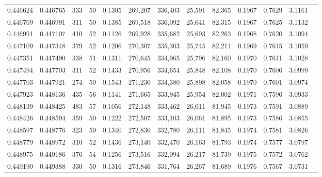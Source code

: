 \begin{tabular}{rrrrrrrrrrrrr}
0.446624 & 0.446765 &   333 &  50 &                                     0.1305 & 269,207 & 336,403 &  25,591 &  82,365 & 0.1967 & 0.7629 & 3.1161 \\
0.446769 & 0.446991 &   311 &  50 &                                     0.1385 & 269,518 & 336,092 &  25,641 &  82,315 & 0.1967 & 0.7625 & 3.1132 \\
0.446991 & 0.447107 &   410 &  52 &                                     0.1126 & 269,928 & 335,682 &  25,693 &  82,263 & 0.1968 & 0.7620 & 3.1094 \\
0.447109 & 0.447348 &   379 &  52 &                                     0.1206 & 270,307 & 335,303 &  25,745 &  82,211 & 0.1969 & 0.7615 & 3.1059 \\
0.447351 & 0.447490 &   338 &  51 &                                     0.1311 & 270,645 & 334,965 &  25,796 &  82,160 & 0.1970 & 0.7611 & 3.1028 \\
0.447494 & 0.447703 &   311 &  52 &                                     0.1433 & 270,956 & 334,654 &  25,848 &  82,108 & 0.1970 & 0.7606 & 3.0999 \\
0.447703 & 0.447921 &   274 &  50 &                                     0.1543 & 271,230 & 334,380 &  25,898 &  82,058 & 0.1970 & 0.7601 & 3.0974 \\
0.447923 & 0.448136 &   435 &  56 &                                     0.1141 & 271,665 & 333,945 &  25,954 &  82,002 & 0.1971 & 0.7596 & 3.0933 \\
0.448139 & 0.448425 &   483 &  57 &                                     0.1056 & 272,148 & 333,462 &  26,011 &  81,945 & 0.1973 & 0.7591 & 3.0889 \\
0.448426 & 0.448594 &   359 &  50 &                                     0.1222 & 272,507 & 333,103 &  26,061 &  81,895 & 0.1973 & 0.7586 & 3.0855 \\
0.448597 & 0.448776 &   323 &  50 &                                     0.1340 & 272,830 & 332,780 &  26,111 &  81,845 & 0.1974 & 0.7581 & 3.0826 \\
0.448779 & 0.448972 &   310 &  52 &                                     0.1436 & 273,140 & 332,470 &  26,163 &  81,793 & 0.1974 & 0.7577 & 3.0797 \\
0.448975 & 0.449186 &   376 &  54 &                                     0.1256 & 273,516 & 332,094 &  26,217 &  81,739 & 0.1975 & 0.7572 & 3.0762 \\
0.449190 & 0.449388 &   330 &  50 &                                     0.1316 & 273,846 & 331,764 &  26,267 &  81,689 & 0.1976 & 0.7567 & 3.0731 \\

\end{tabular}

